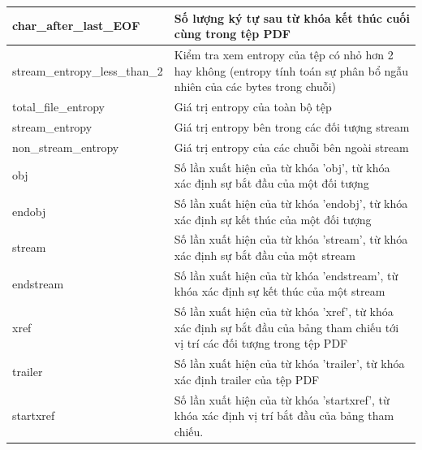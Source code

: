 \documentclass[./../main.tex]{subfiles}
\begin{document}
\begin{longtable}[c]{|p{}|p{}|}
	char\_after\_last\_EOF                    & Số lượng ký tự sau từ khóa kết thúc cuối cùng trong tệp PDF                                                                 \\ \hline
	stream\_entropy\_less\_than\_2            & Kiểm tra xem entropy của tệp có nhỏ hơn 2 hay không (entropy tính toán sự phân bổ ngẫu nhiên của các bytes trong chuỗi)     \\ \hline
	total\_file\_entropy                      & Giá trị entropy của toàn bộ tệp                                                                                             \\ \hline
	stream\_entropy                           & Giá trị entropy bên trong các đối tượng stream                                                                              \\ \hline
	non\_stream\_entropy                      & Giá trị entropy của các chuỗi bên ngoài stream                                                                              \\ \hline
	obj                                       & Số lần xuất hiện của từ khóa 'obj', từ khóa xác định sự bắt đầu của một đối tượng                                           \\ \hline
	endobj                                    & Số lần xuất hiện của từ khóa 'endobj', từ khóa xác định sự kết thúc của một đối tượng                                       \\ \hline
	stream                                    & Số lần xuất hiện của từ khóa 'stream', từ khóa xác định sự bắt đầu của một stream                                           \\ \hline
	endstream                                 & Số lần xuất hiện của từ khóa 'endstream', từ khóa xác định sự kết thúc của một stream                                       \\ \hline
	xref                                      & Số lần xuất hiện của từ khóa 'xref', từ khóa xác định sự bắt đầu của bảng tham chiếu tới vị trí các đối tượng trong tệp PDF \\ \hline
	trailer                                   & Số lần xuất hiện của từ khóa 'trailer', từ khóa xác định trailer của tệp PDF                                                \\ \hline
	startxref                                 & Số lần xuất hiện của từ khóa 'startxref', từ khóa xác định vị trí bắt đầu của bảng tham chiếu.                              \\ \hline

\end{longtable}
\end{document}
